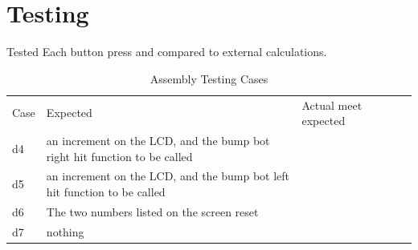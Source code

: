 \documentclass[12pt,letterpaper]{article}
\begin{document}
	

\section{Testing}
Tested Each button press and compared to external calculations.
\begin{table}[h]
	\centering
	\begin{tabular}{|l|l|l|ll}
		\cline{1-3}
		Case & Expected & Actual meet expected &  &  \\ \cline{1-3}
	d4	&an increment on the LCD, and the bump bot right hit function to be called&	\checkmark  &  \\ \cline{1-3}
	d5	&an increment on the LCD, and the bump bot left hit function to be called&	\checkmark	&  \\ \cline{1-3}
	d6	&The two numbers listed on the screen reset&	\checkmark  &  \\ \cline{1-3}
	d7	&nothing&	\checkmark	&  \\ \cline{1-3}
	
	\end{tabular}
\caption{Assembly Testing Cases}
\end{table}
\end{document}
